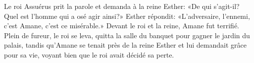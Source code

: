 Le roi Assuérus prit la parole et demanda à la reine Esther:
	«De qui s’agit-il? Quel est l’homme qui a osé agir ainsi?»
Esther répondit: «L’adversaire, l’ennemi, c’est Amane, c’est ce misérable.»
Devant le roi et la reine, Amane fut terrifié.
Plein de fureur, le roi se leva,
	quitta la salle du banquet pour gagner le jardin du palais,
	tandis qu’Amane se tenait près de la reine Esther et lui demandait grâce pour sa vie,
	voyant bien que le roi avait décidé sa perte.
